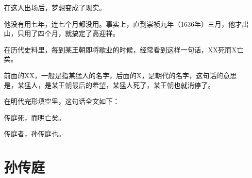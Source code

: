 \begin{multicols}{\theparacolNo}
在这人出场后，梦想变成了现实。

他没有用七年，连七个月都没用。事实上，直到崇祯九年（1636年）三月，他才出山，只用了四个月，就搞定了高迎祥。

在历代史料里，每到某王朝即将歇业的时候，经常看到这样一句话，XX死而X亡矣。

前面的XX，一般是指某猛人的名字，后面的X，是朝代的名字，这句话的意思是，某猛人，是某王朝最后的希望，某猛人死了，某王朝也就消停了。

在明代完形填空里，这句话全文如下：

传庭死，而明亡矣。

传庭者，孙传庭也。
\ifnum{}
	\end{multicols}
\fi
\newpage
\section{孙传庭}
\ifnum{}
